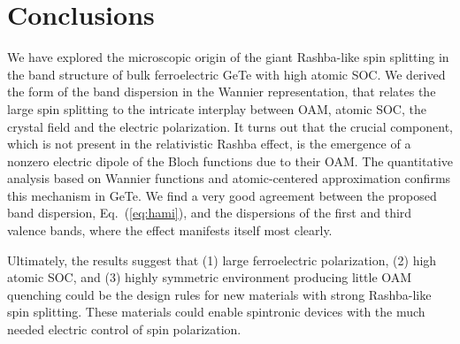 \section{Conclusions}

We have explored the microscopic origin of the giant Rashba-like spin splitting in the band structure of bulk ferroelectric GeTe with high atomic SOC. We derived the form of the band dispersion in the Wannier representation, that relates the large spin splitting to the intricate interplay between OAM, atomic SOC, the crystal field and the electric polarization. It turns out that the crucial component, which is not present in the relativistic Rashba effect, is the emergence of a nonzero electric dipole of the Bloch functions due to their OAM. The quantitative analysis based on Wannier functions and atomic-centered approximation confirms this mechanism in GeTe. We find a very good agreement between the proposed band dispersion, Eq.~(\ref{eq:hami}), and the dispersions of the first and third valence bands, where the effect manifests itself most clearly.

Ultimately, the results suggest that (1) large ferroelectric polarization, (2) high atomic SOC, and (3) highly symmetric environment producing little OAM quenching could be the design rules for new materials with strong Rashba-like spin splitting. These materials could enable spintronic devices with the much needed electric control of spin polarization.

\printbibliography

